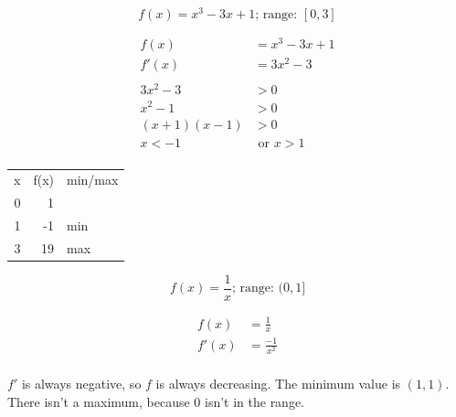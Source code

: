 \documentclass[fleqn,addpoints]{exam}
\begin{document}
\begin{questions}


\question[5]
\label{min_max_range:first}
\[
  f(x) = x^3  -3x + 1 \text{; range: } [0, 3]
\]

\begin{solution}[8 cm]
\begin{align*}
  f(x) &= x^3  -3x + 1 \\
  f'(x) &= 3x^2  -3 \\
\\
  3x^2  -3 &> 0 \\
  x^2  - 1 &> 0 \\
  (x + 1)(x - 1) &> 0 \\
  x < -1 &\text{ or } x > 1 \\
\end{align*}

\begin{tabular}{rrl}
\toprule
x & f(x) & min/max \\
0 & 1 & \\
1 & -1 & min \\
3 & 19 & max \\
\bottomrule
\end{tabular}

\end{solution}

\ifprintanswers
\pagebreak
\fi

\question[5]
\label{min_max_range:last}
\[
  f(x) = \frac{1}{x} \text{; range: } (0, 1]
\]

\begin{solution}[6 cm]
\begin{align*}
  f(x) &= \frac{1}{x} \\
  f'(x) &= \frac{-1}{x^2} \\
\end{align*}

$f'$ is always negative, so $f$ is always decreasing.  The minimum value is $(1, 1)$.  There isn't a maximum, because 0
isn't in the range.

\end{solution}



\end{questions}
\end{document}
